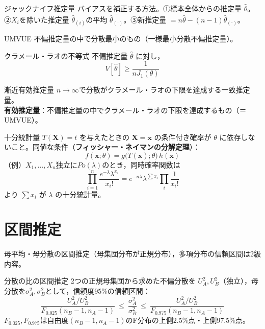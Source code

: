 \documentclass[a4paper,11pt]{ltjsarticle}
\begin{document}
\begin{term}{ジャックナイフ推定量}
バイアスを補正する方法。①標本全体からの推定量 $\hat\theta$。②$X_i$を除いた推定量 $\hat\theta_{(i)}$の平均 $\overline{\hat\theta_{(\cdot)}}$。③新推定量 $= n\hat\theta-(n-1)\overline{\hat\theta_{(\cdot)}}$。
\end{term}

\begin{term}{UMVUE}
不偏推定量の中で分散最小のもの（一様最小分散不偏推定量）。
\end{term}

\begin{term}{クラメール・ラオの不等式}
不偏推定量 $\hat\theta$ に対し，
\[
V[\hat\theta] \ge \frac{1}{n J_1(\theta)}
\]
\end{term}

\begin{term}{漸近有効推定量}
$n\to\infty$で分散がクラメール・ラオの下限を達成する一致推定量。\\
\textbf{有効推定量}：不偏推定量の中でクラメール・ラオの下限を達成するもの（＝UMVUE）。
\end{term}

\begin{term}{十分統計量}
$T(\bm X)=t$ を与えたときの $\bm X=\bm x$ の条件付き確率が $\theta$ に依存しないこと。同値な条件（\textbf{フィッシャー・ネイマンの分解定理}）：
\[
f(\bm x;\theta) = g\big(T(\bm x);\theta\big)\,h(\bm x)
\]
（例）$X_1,\dots,X_n$独立に$Po(\lambda)$のとき，同時確率関数は
\[
\prod_{i=1}^n \frac{e^{-\lambda}\lambda^{x_i}}{x_i!} = e^{-n\lambda}\lambda^{\sum x_i}\prod_i\frac{1}{x_i!}
\]
より $\sum x_i$ が $\lambda$ の十分統計量。
\end{term}

\section{区間推定}

母平均・母分散の区間推定（母集団分布が正規分布），多項分布の信頼区間は2級内容。

\begin{term}{分散の比の区間推定}
2つの正規母集団から求めた不偏分散を $U_A^2,U_B^2$（独立），母分散を$\sigma_A^2,\sigma_B^2$として，信頼度95\%の信頼区間：
\[
\frac{U_A^2/U_B^2}{F_{0.025}(n_B-1,n_A-1)} \ \le\ \frac{\sigma_A^2}{\sigma_B^2}\ \le\ \frac{U_A^2/U_B^2}{F_{0.975}(n_B-1,n_A-1)}
\]
$F_{0.025},F_{0.975}$は自由度$(n_B-1,n_A-1)$のF分布の上側2.5\%点・上側97.5\%点。
\end{term}
\end{document}
